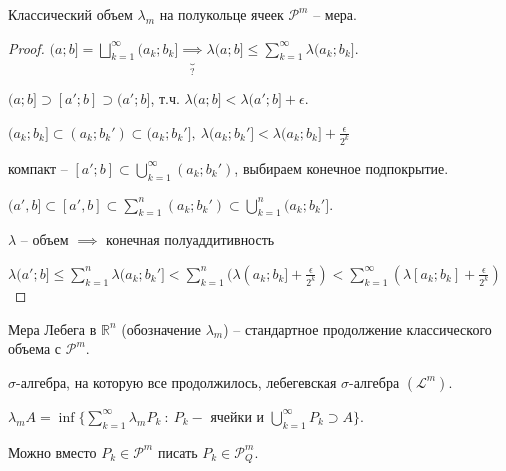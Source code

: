 
\begin{theorem}
    Классический объем $\lambda_m$ на полукольце ячеек $\mathcal{P}^m$ -- мера.
\end{theorem}

\begin{proof}
    $(a; b] = \bigsqcup_{k=1}^{\infty} (a_k; b_k] \underbrace{\implies}_{?} \lambda (a; b] \leq \sum_{k=1}^{\infty} \lambda (a_k; b_k]$.

    $(a; b] \supset [a'; b] \supset (a'; b]$, т.ч. $\lambda (a; b] < \lambda(a'; b] + \epsilon$.

    $(a_k; b_k] \subset (a_k; b_k') \subset (a_k; b_k'], \ \lambda (a_k; b_k'] < \lambda (a_k; b_k] + \frac{\epsilon}{2^k}$

    компакт -- $[a'; b] \subset \bigcup_{k=1}^{\infty} (a_k; b_k')$, выбираем конечное подпокрытие.


    $(a', b] \subset [a', b] \subset \sum_{k=1}^{n} (a_k; b_k') \subset \bigcup_{k=1}^{n} (a_k; b_k']$.

    $\lambda$ -- объем $\implies$ конечная полуаддитивность
    
    $\lambda (a'; b] \leq \sum_{k=1}^{n} \lambda (a_k; b_k'] < \sum_{k=1}^{n} (\lambda (a_k; b_k] + \frac{\epsilon}{2^k}) < \sum_{k=1}^{\infty} (\lambda [a_k; b_k] + \frac{\epsilon}{2^k})$

\end{proof}

\begin{definition}
    Мера Лебега в $\mathbb{R}^n$ (обозначение $\lambda_m$) -- стандартное продолжение классического объема с $\mathcal{P}^m$.

    $\sigma$-алгебра, на которую все продолжилось, лебегевская $\sigma$-алгебра $(\mathscr{L}^m)$. 
\end{definition}
\begin{remark}
    $\lambda_m A = \inf \{ \sum_{k=1}^{\infty} \lambda_m P_k \ : \ P_k - \text{ ячейки и } \bigcup_{k=1}^{\infty} P_k \supset A \}$.

    Можно вместо $P_k \in \mathcal{P}^m$ писать $P_k \in \mathcal{P}_Q^m$.
\end{remark}

